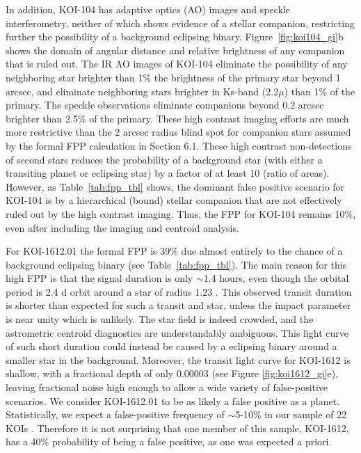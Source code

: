 \documentclass{emulateapj}
\begin{document}
In addition, KOI-104 has adaptive optics (AO) images and speckle
 interferometry, neither of which shows evidence of a stellar
 companion, restricting further the possibility of a background
 eclipsing binary.  Figure~\ref{fig:koi104_gi}b shows the domain of angular distance and
 relative brightness of any companion that is ruled out. The IR AO
 images of KOI-104 eliminate the possibility of any neighboring star
 brighter than 1\% the brightness of the primary star beyond 1 arcsec,
 and eliminate neighboring stars brighter in Ks-band (2.2$\mu$) than
 1\% of the primary.  The speckle observations eliminate companions
 beyond 0.2 arcsec brighter than 2.5\% of the primary.  These high
 contrast imaging efforts are much more restrictive than the 2 arcsec
 radius blind spot for companion stars assumed by the formal FPP
 calculation in Section 6.1.  These high contrast non-detections of
 second stars reduces the probability of a background star (with
 either a transiting planet or eclipsing star) by a factor of at least
 10 (ratio of areas).  However, as Table~\ref{tab:fpp_tbl} shows, the
 dominant false positive scenario for KOI-104 is by a hierarchical
 (bound) stellar companion that are not effectively ruled out by the
 high contrast imaging.  Thus, the FPP for KOI-104 remains 10\%, even
 after including the imaging and centroid analysis.

For KOI-1612.01 the formal FPP is 39\% due almost entirely to the
 chance of a background eclipsing binary (see
 Table~\ref{tab:fpp_tbl}).  The main reason for this high FPP is that
 the signal duration is only $\sim$1.4 hours, even though the orbital
 period is 2.4 d orbit around a star of radius 1.23 \rsun.  This
 observed transit duration is shorter than expected for such a transit
 and star, unless the impact parameter is near unity which is
 unlikely.  The star field is indeed crowded, and the astrometric
 centroid diagnostics are understandably ambiguous.  This light curve
 of such short duration could instead be caused by a eclipsing binary
 around a smaller star in the background. Moreover, the transit light
 curve for KOI-1612 is shallow, with a fractional depth of only
 0.00003 (see Figure \ref{fig:koi1612_gi}e), leaving fractional noise high enough to allow a
 wide variety of false-positive scenarios.  We consider KOI-1612.01 to
 be as likely a false positive as a planet.  Statistically, we expect
 a false-positive frequency of $\sim$5-10\% in our sample of 22 KOIs
 \citep{Morton_Johnson2011, Morton2012, Fressin2013}.  Therefore it is
 not surprising that one member of this sample, KOI-1612, has a 40\%
 probability of being a false positive, as one was expected a priori.
\end{document}
